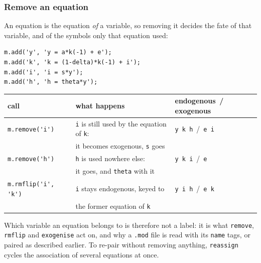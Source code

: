 \documentclass[10pt,slidestop]{beamer}
\theoremstyle{plain}
\begin{document}
\begin{frame}[fragile]
  \frametitle{Remove an equation}

  An equation is the equation \emph{of} a variable, so removing it decides the fate of
  that variable, and of the symbols only that equation used:

  \begin{lstlisting}[style=MatlabConsole,basicstyle=\ttfamily\footnotesize]
m.add('y', 'y = a*k(-1) + e');
m.add('k', 'k = (1-delta)*k(-1) + i');
m.add('i', 'i = s*y');
m.add('h', 'h = theta*y');
  \end{lstlisting}

  \begin{center}\footnotesize
  \begin{tabular}{@{}lll@{}}
    \hline
    call & what happens & endogenous \,/\, exogenous \\
    \hline
    \verb+m.remove('i')+ & \verb+i+ is still used by the equation of \verb+k+: & \verb+y k h+ \,/\, \verb+e i+ \\
                         & it becomes exogenous, \verb+s+ goes & \\
    \verb+m.remove('h')+ & \verb+h+ is used nowhere else: & \verb+y k i+ \,/\, \verb+e+ \\
                         & it goes, and \verb+theta+ with it & \\
    \verb+m.rmflip('i', 'k')+ & \verb+i+ stays endogenous, keyed to & \verb+y i h+ \,/\, \verb+e k+ \\
                         & the former equation of \verb+k+ & \\
    \hline
  \end{tabular}
  \end{center}

  \medskip
  \small Which variable an equation belongs to is therefore not a label: it is what
  \verb+remove+, \verb+rmflip+ and \verb+exogenise+ act on, and why a \verb+.mod+ file is
  read with its \verb+name+ tags, or paired as described earlier. To re-pair without
  removing anything, \verb+reassign+ cycles the association of several equations at once.

\end{frame}
\end{document}
